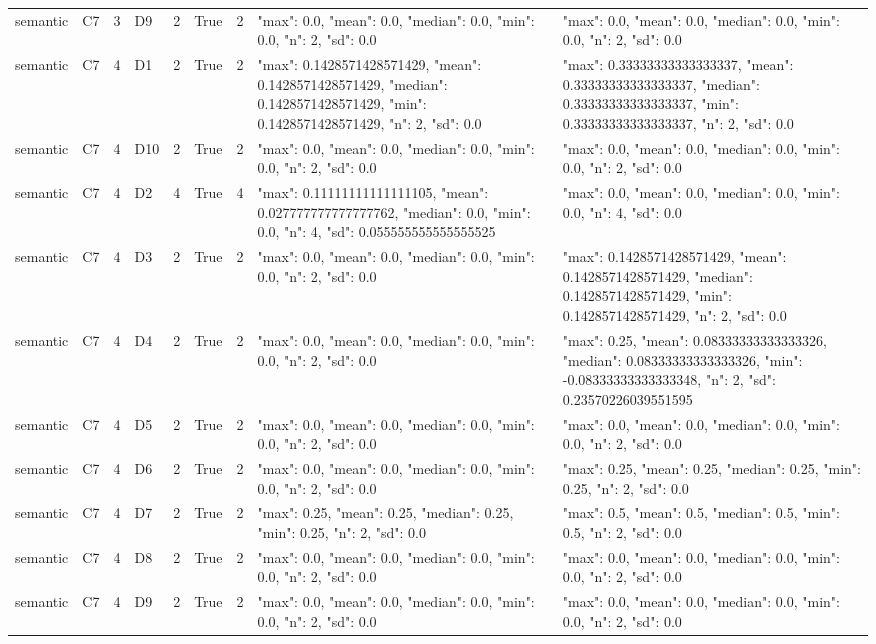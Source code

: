 \begin{tabular}{lllllllll}
semantic & C7 & 3 & D9 & 2 & True & 2 & {"max": 0.0, "mean": 0.0, "median": 0.0, "min": 0.0, "n": 2, "sd": 0.0} & {"max": 0.0, "mean": 0.0, "median": 0.0, "min": 0.0, "n": 2, "sd": 0.0} \\
semantic & C7 & 4 & D1 & 2 & True & 2 & {"max": 0.1428571428571429, "mean": 0.1428571428571429, "median": 0.1428571428571429, "min": 0.1428571428571429, "n": 2, "sd": 0.0} & {"max": 0.33333333333333337, "mean": 0.33333333333333337, "median": 0.33333333333333337, "min": 0.33333333333333337, "n": 2, "sd": 0.0} \\
semantic & C7 & 4 & D10 & 2 & True & 2 & {"max": 0.0, "mean": 0.0, "median": 0.0, "min": 0.0, "n": 2, "sd": 0.0} & {"max": 0.0, "mean": 0.0, "median": 0.0, "min": 0.0, "n": 2, "sd": 0.0} \\
semantic & C7 & 4 & D2 & 4 & True & 4 & {"max": 0.11111111111111105, "mean": 0.027777777777777762, "median": 0.0, "min": 0.0, "n": 4, "sd": 0.055555555555555525} & {"max": 0.0, "mean": 0.0, "median": 0.0, "min": 0.0, "n": 4, "sd": 0.0} \\
semantic & C7 & 4 & D3 & 2 & True & 2 & {"max": 0.0, "mean": 0.0, "median": 0.0, "min": 0.0, "n": 2, "sd": 0.0} & {"max": 0.1428571428571429, "mean": 0.1428571428571429, "median": 0.1428571428571429, "min": 0.1428571428571429, "n": 2, "sd": 0.0} \\
semantic & C7 & 4 & D4 & 2 & True & 2 & {"max": 0.0, "mean": 0.0, "median": 0.0, "min": 0.0, "n": 2, "sd": 0.0} & {"max": 0.25, "mean": 0.08333333333333326, "median": 0.08333333333333326, "min": -0.08333333333333348, "n": 2, "sd": 0.23570226039551595} \\
semantic & C7 & 4 & D5 & 2 & True & 2 & {"max": 0.0, "mean": 0.0, "median": 0.0, "min": 0.0, "n": 2, "sd": 0.0} & {"max": 0.0, "mean": 0.0, "median": 0.0, "min": 0.0, "n": 2, "sd": 0.0} \\
semantic & C7 & 4 & D6 & 2 & True & 2 & {"max": 0.0, "mean": 0.0, "median": 0.0, "min": 0.0, "n": 2, "sd": 0.0} & {"max": 0.25, "mean": 0.25, "median": 0.25, "min": 0.25, "n": 2, "sd": 0.0} \\
semantic & C7 & 4 & D7 & 2 & True & 2 & {"max": 0.25, "mean": 0.25, "median": 0.25, "min": 0.25, "n": 2, "sd": 0.0} & {"max": 0.5, "mean": 0.5, "median": 0.5, "min": 0.5, "n": 2, "sd": 0.0} \\
semantic & C7 & 4 & D8 & 2 & True & 2 & {"max": 0.0, "mean": 0.0, "median": 0.0, "min": 0.0, "n": 2, "sd": 0.0} & {"max": 0.0, "mean": 0.0, "median": 0.0, "min": 0.0, "n": 2, "sd": 0.0} \\
semantic & C7 & 4 & D9 & 2 & True & 2 & {"max": 0.0, "mean": 0.0, "median": 0.0, "min": 0.0, "n": 2, "sd": 0.0} & {"max": 0.0, "mean": 0.0, "median": 0.0, "min": 0.0, "n": 2, "sd": 0.0} \\

\end{tabular}
